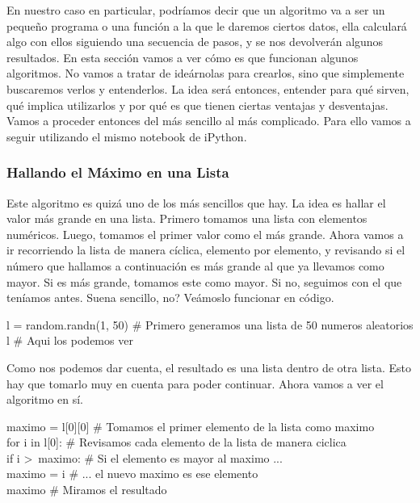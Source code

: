 \documentclass[10pt,letterpaper]{article}
\newenvironment{Code}
{
\begin{lrbox}{\selvestebox}%
\begin{minipage}{\dimexpr\columnwidth-2\fboxsep\relax}
\fontfamily{\ttdefault}\selectfont
}
{\end{minipage}\end{lrbox}%
\begin{center}
\colorbox{light-gray}{\usebox{\selvestebox}}
\end{center}
}
\begin{document}
En nuestro caso en particular, podr\'iamos decir que un algoritmo va a ser un peque\~no programa o una funci\'on a la que le daremos ciertos datos, ella calcular\'a algo con ellos siguiendo una secuencia de pasos, y se nos devolver\'an algunos resultados. En esta secci\'on vamos a ver c\'omo es que funcionan algunos algoritmos. No vamos a tratar de ide\'arnolas para crearlos, sino que simplemente buscaremos verlos y entenderlos. La idea ser\'a entonces, entender para qu\'e sirven, qu\'e implica utilizarlos y por qu\'e es que tienen ciertas ventajas y desventajas. Vamos a proceder entonces del m\'as sencillo al m\'as complicado. Para ello vamos a seguir utilizando el mismo notebook de iPython.

\subsubsection{Hallando el M\'aximo en una Lista}
Este algoritmo es quiz\'a uno de los m\'as sencillos que hay. La idea es hallar el valor m\'as grande en una lista. Primero tomamos una lista con elementos num\'ericos. Luego, tomamos el primer valor como el m\'as grande. Ahora vamos a ir recorriendo la lista de manera c\'iclica, elemento por elemento, y revisando si el n\'umero que hallamos a continuaci\'on es m\'as grande al que ya llevamos como mayor. Si es m\'as grande, tomamos este como mayor. Si no, seguimos con el que ten\'iamos antes. Suena sencillo, no? Ve\'amoslo funcionar en c\'odigo.

\begin{small}
\begin{Code}
l = random.randn(1, 50) \# Primero generamos una lista de 50 numeros aleatorios\\
l \# Aqui los podemos ver
\end{Code}
\end{small}

Como nos podemos dar cuenta, el resultado es una lista dentro de otra lista. Esto hay que tomarlo muy en cuenta para poder continuar. Ahora vamos a ver el algoritmo en s\'i.

\begin{small}
\begin{Code}
maximo = l[0][0] \# Tomamos el primer elemento de la lista como maximo\\
for i in l[0]: \# Revisamos cada elemento de la lista de manera ciclica\\
\hspace*{4mm} if i >\ maximo: \# Si el elemento es mayor al maximo ...\\
\hspace*{12mm} maximo = i \# ... el nuevo maximo es ese elemento\\
maximo \# Miramos el resultado
\end{Code}
\end{small}
\end{document}
